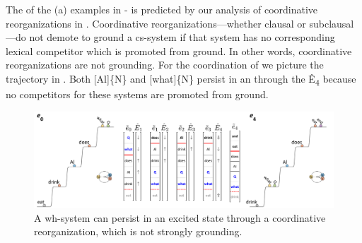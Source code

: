 \label{ex:7:22}
    \label{ex:7:22a}
    \label{ex:7:22b}
    \label{ex:7:22c}
\z
\z

\label{ex:7:23}
    \label{ex:7:23a}
    \label{ex:7:23b}
    \label{ex:7:23c}
\z
\z

\label{ex:7:24}
    \label{ex:7:24a}
    \label{ex:7:24b}
    \label{ex:7:24c}
\z
\z

The  of the (a) examples in - is predicted by our analysis of coordinative reorganizations in . Coordinative reorganizations—whether clausal or subclausal—do not demote to ground a cs-system if that system has no corresponding lexical competitor which is promoted from ground. In other words, coordinative reorganizations are not grounding. For the  coordination of  we picture the trajectory in {}. Both [Al]\{N\} and [what]\{N\} persist in an  through the  Ê\textsubscript{4} because no competitors for these systems are promoted from ground.

  
\begin{figure}
\includegraphics[width=\textwidth]{figures/Tilsen-img165.png}
\caption{A wh-system can persist in an excited state through a coordinative reorganization, which is not strongly grounding.}
\label{fig:7:21}
\end{figure}
 

